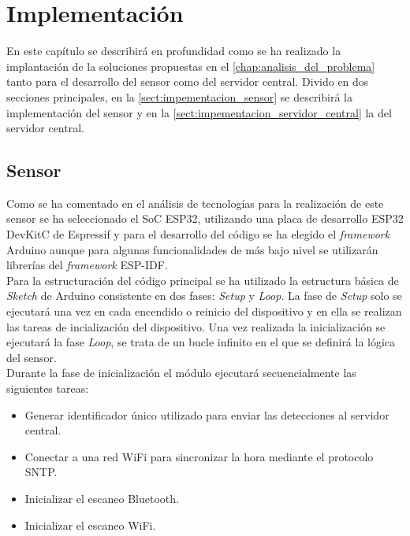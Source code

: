 \documentclass[../proyecto.tex]{subfiles}
\begin{document}
\chapter{Implementación}\label{chap:implementacion}

En este capítulo se describirá en profundidad como se ha realizado la implantación de la soluciones propuestas en el \autoref{chap:analisis_del_problema} tanto para el desarrollo del sensor como del servidor central. Divido en dos secciones principales, en la \autoref{sect:impementacion_sensor} se describirá la implementación del sensor y en la \autoref{sect:impementacion_servidor_central} la del servidor central.\\

 \section{Sensor}\label{sect:impementacion_sensor}

Como se ha comentado en el análisis de tecnologías para la realización de este sensor se ha seleccionado el SoC ESP32, utilizando una placa de desarrollo ESP32 DevKitC de Espressif y para el desarrollo del código se ha elegido el \textit{framework} Arduino aunque para algunas funcionalidades de más bajo nivel se utilizarán librerías del \textit{framework} ESP-IDF.\\

Para la estructuración del código principal se ha utilizado la estructura básica de \textit{Sketch} de Arduino consistente en dos fases: \textit{Setup} y \textit{Loop}. La fase de \textit{Setup} solo se ejecutará una vez en cada encendido o reinicio del dispositivo y en ella se realizan las tareas de incialización del dispositivo. Una vez realizada la inicialización se ejecutará la fase \textit{Loop}, se trata de un bucle infinito en el que se definirá la lógica del sensor.\\

Durante la fase de inicialización el módulo ejecutará secuencialmente las siguientes tareas:
\begin{itemize}
  \item Generar identificador único utilizado para enviar las detecciones al servidor central.
  \item Conectar a una red WiFi para sincronizar la hora mediante el protocolo SNTP.
  \item Inicializar el escaneo Bluetooth.
  \item Inicializar el escaneo WiFi.
\end{itemize}
\end{document}

